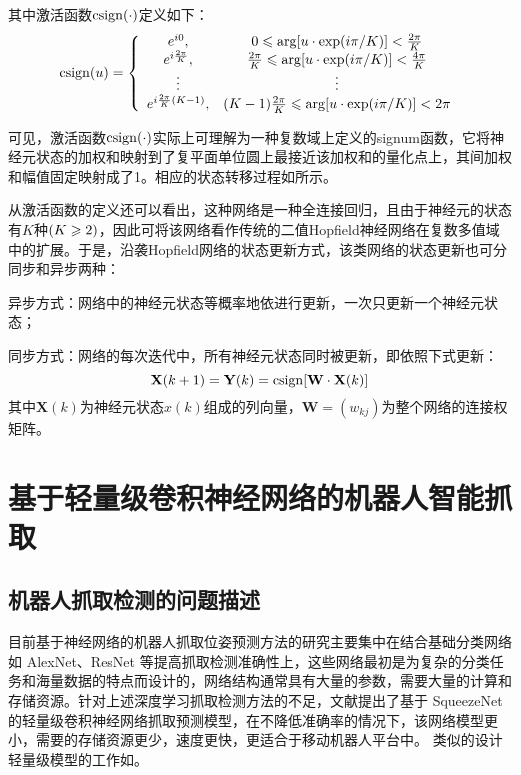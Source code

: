 \documentclass{hitszthesis}
\begin{document}
其中激活函数$\operatorname{csign}(\cdot)$定义如下：
\begin{equation}
\operatorname{csign}(u)=
\left\{
\begin{array}{cc}
	e^{i0},&0\leqslant\arg[u\cdot\exp(i\pi/K)]<\frac{2\pi}{K}\\
	e^{i\frac{2\pi}{K}},&\frac{2\pi}{K}\leqslant\arg[u\cdot\exp(i\pi/K)]<\frac{4\pi}{K}\\
	\vdots&\vdots\\
	e^{i\frac{2\pi}{K}(K-1)},&(K-1)\frac{2\pi}{K}
	                                  \leqslant\arg[u\cdot\exp(i\pi/K)]<2\pi\\
\end{array}
\right.
\end{equation}

可见，激活函数$\operatorname{csign}(\cdot)$实际上可理解为一种复数域上定义的signum函数，它将神经元状态的加权和映射到了复平面单位圆上最接近该加权和的量化点上，其间加权和幅值固定映射成了1。相应的状态转移过程如所示。

从激活函数的定义还可以看出，这种网络是一种全连接回归，且由于神经元的状态有$K$种$(K\geqslant2)$，因此可将该网络看作传统的二值Hopf\/ield神经网络在复数多值域中的扩展。于是，沿袭Hopf\/ield网络的状态更新方式，该类网络的状态更新也可分同步和异步两种：

异步方式：网络中的神经元状态等概率地依进行更新，一次只更新一个神经元状态；

同步方式：网络的每次迭代中，所有神经元状态同时被更新，即依照下式更新：\begin{equation}
{\mathbf{ X}}(k+1)=\mathbf{ Y}(k)=\operatorname{csign}[\mathbf{ W }\cdot\mathbf{ X }(k)]               
\end{equation}
其中$\mathbf{ X}(k)$为神经元状态$x(k)$组成的列向量，$\mathbf{ W}=(w_{kj})$为整个网络的连接权矩阵。

\section{基于轻量级卷积神经网络的机器人智能抓取}

\subsection{机器人抓取检测的问题描述}

目前基于神经网络的机器人抓取位姿预测方法的研究主要集中在结合基础分类网络如 AlexNet、ResNet 等提高抓取检测准确性上，这些网络最初是为复杂的分类任务和海量数据的特点而设计的，网络结构通常具有大量的参数，需要大量的计算和存储资源。针对上述深度学习抓取检测方法的不足，文献\cite{bib:one}提出了基于 SqueezeNet 的轻量级卷积神经网络抓取预测模型，在不降低准确率的情况下，该网络模型更小，需要的存储资源更少，速度更快，更适合于移动机器人平台中。 类似的设计轻量级模型的工作如\cite{bib11}。
\end{document}
